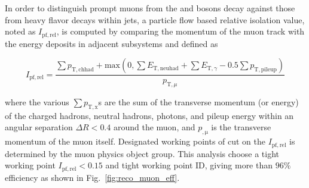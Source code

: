 In order to distinguish prompt muons from the \PW and \PZ bosons decay against those from heavy flavor decays within jets, a particle flow based relative isolation value, noted as $I_{\mathrm{pf,rel}}$, is computed by comparing the momentum of the muon track with the energy deposits in adjacent subsystems and defined as
\begin{linenomath}\begin{equation}\label{eq:reco_muon_iso}
    I_{\mathrm{pf,rel}} = \frac{ \sum p_{\mathrm{T,chhad}} + \mathrm{max}(0, \sum E_{\mathrm{T,neuhad}}  +   \sum E_{\mathrm{T,}\gamma} -  0.5\sum p_{\mathrm{T,pileup}})     }{  p_{\mathrm{T,}\mu} }
\end{equation}\end{linenomath}
where the various $\sum p_{\mathrm{T,x}}$s are the sum of the transverse momentum (or energy) of the charged hadrons, neutral hadrons, photons, and pileup energy within an angular separation $\Delta R < 0.4$ around the muon, and $p_{\mathrm{,\mu}}$ is the transverse momentum of the muon itself.
Designated working points of cut on the $I_{\mathrm{pf,rel}}$ is determined by the muon physics object group.
This analysis choose a tight working point $I_{\mathrm{pf,rel}} < 0.15$ and tight working point ID, giving more than $96\%$ efficiency as shown in Fig.~\ref{fig:reco_muon_eff}.

